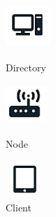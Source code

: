 \documentclass{article}
\begin{document}
\begin{figure}[h]
\centering
\begin{minipage}{.3\textwidth}
  	\centering
  	\includegraphics[width=1.7cm,height=1.7cm,keepaspectratio]{img/Directory.png}
	\caption{Directory}
\end{minipage}
\begin{minipage}{.3\textwidth}
  	\centering
	\includegraphics[width=1.5cm,height=1.5cm,keepaspectratio]{img/Node.png}
	\caption{Node}
\end{minipage}
\begin{minipage}{.3\textwidth}
  	\centering
	\includegraphics[width=1.4cm,height=1.4cm,keepaspectratio]{img/Client.png}
	\caption{Client}
\end{minipage}
\end{figure}
\end{document}

